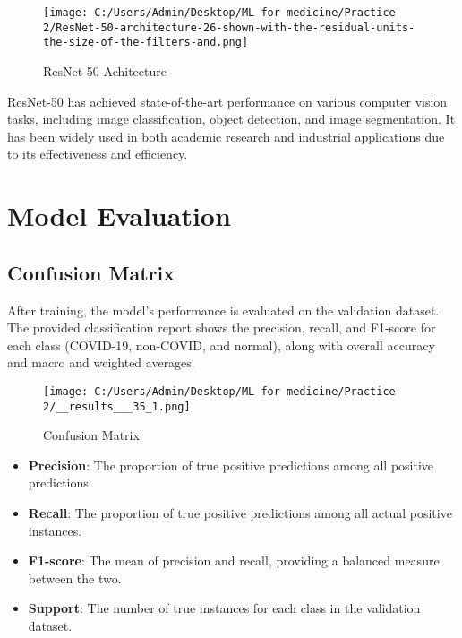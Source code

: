 \documentclass{article}
\begin{document}
\begin{figure}[htbp]
    \centering
    \texttt{[image: C:/Users/Admin/Desktop/ML for medicine/Practice 2/ResNet-50-architecture-26-shown-with-the-residual-units-the-size-of-the-filters-and.png]}
    \caption{ResNet-50 Achitecture}
    \label{fig:resnet}
\end{figure}

ResNet-50 has achieved state-of-the-art performance on various computer vision tasks, including image classification, object detection, and image segmentation. 
It has been widely used in both academic research and industrial applications due to its effectiveness and efficiency.


\section{Model Evaluation}
\subsection{Confusion Matrix}

After training, the model's performance is evaluated on the validation dataset. The provided classification report shows the precision, recall, and F1-score for each class (COVID-19, non-COVID, and normal), along with overall accuracy and macro and weighted averages.

\begin{figure}[htbp]
    \centering
    \texttt{[image: C:/Users/Admin/Desktop/ML for medicine/Practice 2/\_\_results\_\_\_35\_1.png]}
    \caption{Confusion Matrix}
    \label{fig:confusion}
\end{figure}

\begin{itemize}
    \item \textbf{Precision}: The proportion of true positive predictions among all positive predictions.
    \item \textbf{Recall}: The proportion of true positive predictions among all actual positive instances.
    \item \textbf{F1-score}: The mean of precision and recall, providing a balanced measure between the two.
    \item \textbf{Support}: The number of true instances for each class in the validation dataset.
\end{itemize}
\end{document}
